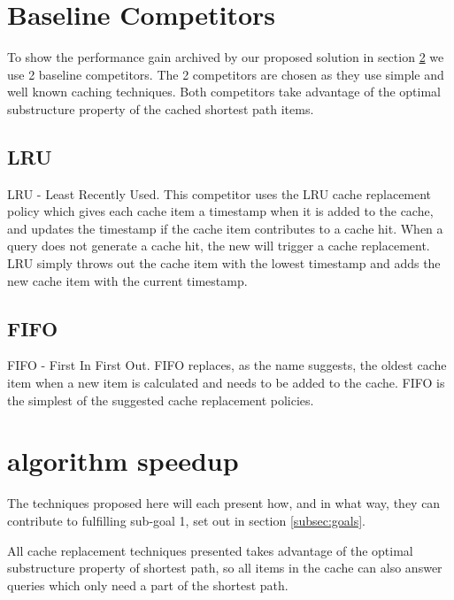 \section{Baseline Competitors}
To show the performance gain archived by our proposed solution in section \ref{sec:contribution} we use 2 baseline competitors.
The 2 competitors are chosen as they use simple and well known caching techniques. Both competitors take advantage of the optimal substructure property of the cached shortest path items.

\subsection{LRU}

LRU - Least Recently Used. This competitor uses the LRU cache replacement policy which gives each cache item a timestamp when it is added to the cache, and updates the timestamp if the cache item contributes to a cache hit. When a \spath query does not generate a cache hit, the new \spath will trigger a cache replacement. LRU simply throws out the cache item with the lowest timestamp and adds the new cache item with the current timestamp.

\subsection{FIFO}

FIFO - First In First Out. FIFO replaces, as the name suggests, the oldest cache item when a new \spath item is calculated and needs to be added to the cache. FIFO is the simplest of the suggested cache replacement policies.




\section{\spath algorithm speedup} \label{sec:contribution}

The techniques proposed here will each present how, and in what way, they can contribute to fulfilling sub-goal 1, set out in section \ref{subsec:goals}.

All cache replacement techniques presented takes advantage of the optimal substructure property of shortest path, so all items in the \spath cache can also answer queries which only need a part of the shortest path.

